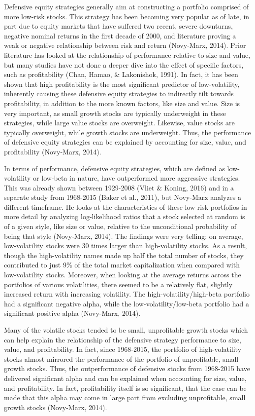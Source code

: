 \documentclass[12pt,twoside]{reedthesis}
\theoremstyle{definition}
\theoremstyle{definition}
\theoremstyle{definition}
\theoremstyle{remark}
\begin{document}
Defensive equity strategies generally aim at constructing a portfolio
comprised of more low-risk stocks. This strategy has been becoming very
popular as of late, in part due to equity markets that have suffered two
recent, severe downturns, negative nominal returns in the first decade
of 2000, and literature proving a weak or negative relationship between
risk and return (Novy-Marx, 2014). Prior literature has looked at the
relationship of performance relative to size and value, but many studies
have not done a deeper dive into the effect of specific factors, such as
profitability (Chan, Hamao, \& Lakonishok, 1991). In fact, it has been
shown that high profitability is the most significant predictor of
low-volatility, inherently causing these defensive equity strategies to
indirectly tilt towards profitability, in addition to the more known
factors, like size and value. Size is very important, as small growth
stocks are typically underweight in these strategies, while large value
stocks are overweight. Likewise, value stocks are typically overweight,
while growth stocks are underweight. Thus, the performance of defensive
equity strategies can be explained by accounting for size, value, and
profitability (Novy-Marx, 2014).

In terms of performance, defensive equity strategies, which are defined
as low-volatility or low-beta in nature, have outperformed more
aggressive strategies. This was already shown between 1929-2008 (Vliet
\& Koning, 2016) and in a separate study from 1968-2015 (Baker et al.,
2011), but Novy-Marx analyzes a different timeframe. He looks at the
characteristics of these low-risk portfolios in more detail by analyzing
log-likelihood ratios that a stock selected at random is of a given
style, like size or value, relative to the unconditional probability of
being that style (Novy-Marx, 2014). The findings were very telling: on
average, low-volatility stocks were 30 times larger than high-volatility
stocks. As a result, though the high-volatility names made up half the
total number of stocks, they contributed to just 9\% of the total market
capitalization when compared with low-volatility stocks. Moreover, when
looking at the average returns across the portfolios of various
volatilities, there seemed to be a relatively flat, slightly increased
return with increasing volatility. The high-volatility/high-beta
portfolio had a significant negative alpha, while the
low-volatility/low-beta portfolio had a significant positive alpha
(Novy-Marx, 2014).

Many of the volatile stocks tended to be small, unprofitable growth
stocks which can help explain the relationship of the defensive strategy
performance to size, value, and profitability. In fact, since 1968-2015,
the portfolio of high-volatility stocks almost mirrored the performance
of the portfolio of unprofitable, small growth stocks. Thus, the
outperformance of defensive stocks from 1968-2015 have delivered
significant alpha and can be explained when accounting for size, value,
and profitability. In fact, profitability itself is so significant, that
the case can be made that this alpha may come in large part from
excluding unprofitable, small growth stocks (Novy-Marx, 2014).
\end{document}
